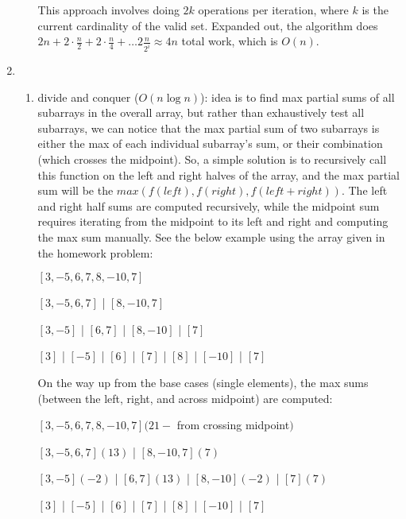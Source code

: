 \documentclass[12pt]{article}
\begin{document}
\begin{enumerate}
\begin{enumerate}
        This approach involves doing $2k$ operations per iteration, where $k$ is the current cardinality of the valid set. 
        Expanded out, the algorithm does $2n + 2 \cdot \frac{n}{2} + 2 \cdot \frac{n}{4} + \dots 2 \frac{n}{2^i} \approx 4n$ 
        total work, which is $O(n)$.

    \end{enumerate}
    
    \item 
    
    \begin{enumerate}
        \item divide and conquer ($O(n\log n)$):
        idea is to find max partial sums of all subarrays in the overall array, but rather than 
        exhaustively test all subarrays, we can notice that the max partial sum of two subarrays is 
        either the max of each individual subarray's sum, or their combination (which crosses the midpoint). 
        So, a simple solution is to recursively call this function on the left and right halves of the array, and 
        the max partial sum will be the $max(f(left), f(right), f(left + right))$. The left and right half sums 
        are computed recursively, while the midpoint sum requires iterating from the midpoint to its left 
        and right and computing the max sum manually. See the below example using the array given in the homework problem:

        \begin{center}
            $[3, -5, 6, 7, 8, -10, 7]$

            $[3, -5, 6, 7]$ | $[8, -10, 7]$

            $[3, -5]$ | $[6, 7]$ | $[8, -10]$ | $[7]$

            $[3]$ | $[-5]$ | $[6]$ | $[7]$ | $[8]$ | $[-10]$ | $[7]$
        \end{center}

        On the way up from the base cases (single elements), the max sums (between the left, right, and across midpoint) 
        are computed:

        \begin{center}
            $[3, -5, 6, 7, 8, -10, 7] (21 -$ from crossing midpoint$)$

            $[3, -5, 6, 7] (13)$ | $[8, -10, 7] (7)$

            $[3, -5] (-2)$ | $[6, 7] (13)$ | $[8, -10] (-2)$ | $[7](7)$

            $[3]$ | $[-5]$ | $[6]$ | $[7]$ | $[8]$ | $[-10]$ | $[7]$
        \end{center}


\end{enumerate}
\end{enumerate}
\end{document}
